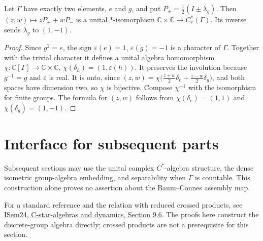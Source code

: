 \begin{proposition}\label{prop:reduced-group-cstar-order-two}
\leanok
{}
Let $\Gamma$ have exactly two elements, $e$ and $g$, and put
$P_\pm=\tfrac12(I\pm\lambda_g)$. Then $(z,w)\mapsto zP_++wP_-$ is a unital
$*$-isomorphism $\mathbb C\times\mathbb C\to C_r^*(\Gamma)$. Its inverse
sends $\lambda_g$ to $(1,-1)$.
\end{proposition}
\begin{proof}
\leanok
Since $g^2=e$, the sign $\varepsilon(e)=1$, $\varepsilon(g)=-1$ is a
character of $\Gamma$. Together with the trivial character it defines a
unital algebra homomorphism $\chi:\mathbb C[\Gamma]\to\mathbb C\times\mathbb C$,
$\chi(\delta_h)=(1,\varepsilon(h))$. It preserves the involution because
$g^{-1}=g$ and $\varepsilon$ is real. It is onto, since
$(z,w)=\chi\bigl(\tfrac{z+w}2\delta_e+\tfrac{z-w}2\delta_g\bigr)$, and both
spaces have dimension two, so $\chi$ is bijective. Compose $\chi^{-1}$ with
the isomorphism for finite groups. The formula for $(z,w)$ follows from
$\chi(\delta_e)=(1,1)$ and $\chi(\delta_g)=(1,-1)$.
\end{proof}

\section{Interface for subsequent parts}
Subsequent sections may use the unital complex $C^*$-algebra structure,
the dense isometric group-algebra embedding, and separability when
$\Gamma$ is countable. This construction alone proves no assertion
about the Baum--Connes assembly map.

For a standard reference and the relation with reduced crossed products,
see \href{https://www.math.uni-sb.de/ag/speicher/weber/ISem24/ISem24LectureNotes.pdf}
{ISem24, C-star-algebras and dynamics, Section 9.6}.
The proofs here construct the discrete-group algebra directly; crossed
products are not a prerequisite for this section.
